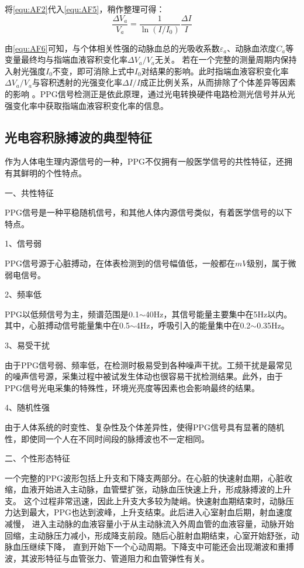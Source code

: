 将\autoref{equ:AF2}代入\autoref{equ:AF5}，稍作整理可得：
\begin{equation}
    \label{equ:AF6}
    \frac{\Delta V_{a}}{V_{a}}=\frac{1}{\ln(I/I_{0})}\frac{\Delta I}{I}
\end{equation}

由\autoref{equ:AF6}可知，与个体相关性强的动脉血总的光吸收系数$\varepsilon _{a}$、动脉血浓度$C_{a}$等变量最终均与指端血液容积变化率$\Delta V_{a}/{V_{a}}$无关。
若在一个完整的测量周期内保持入射光强度$I_{0}$不变，即可消除上式中$I_{0}$对结果的影响。此时指端血液容积变化率$\Delta V_{a}/{V_{a}}$与容积透射的光强变化率$\Delta I/I$成正比例关系，从而排除了个体差异等因素的影响
\cite{1980Spectrophotometric,4122392,PPGYY}。PPG信号检测正是依此原理，通过光电转换硬件电路检测光信号并从光强变化率中获取指端血液容积变化率的信息。

\subsection{光电容积脉搏波的典型特征}
作为人体电生理内源信号的一种，PPG不仅拥有一般医学信号的共性特征，还拥有其鲜明的个性特点。

一、共性特征

PPG信号是一种平稳随机信号，和其他人体内源信号类似，有着医学信号的以下特点\cite{Ma2015,Qiu2012,Naraharisetti2011,Miao2020,LMX2019}。

1、信号弱

PPG信号源于心脏搏动，在体表检测到的信号幅值低，一般都在$mV$级别，属于微弱电信号。

2、频率低

PPG以低频信号为主，频谱范围是0.1$\sim$40Hz，其信号能量主要集中在5Hz以内。其中，心脏搏动信号能量集中在0.5$\sim$4Hz，呼吸引入的能量集中在0.2$\sim$0.35Hz。

3、易受干扰

由于PPG信号弱、频率低，在检测时极易受到各种噪声干扰。工频干扰是最常见的噪声信号源，采集过程中被试发生体动也很容易干扰检测结果。此外，由于PPG信号光电采集的特殊性，环境光亮度等因素也会影响最终的结果。

4、随机性强

由于人体系统的时变性、复杂性及个体差异性，使得PPG信号具有显著的随机性，即使同一个人在不同时间段的脉搏波也不一定相同。

二、个性形态特征

一个完整的PPG波形包括上升支和下降支两部分。在心脏的快速射血期，心脏收缩，血液开始进入主动脉，血管壁扩张，动脉血压快速上升，形成脉搏波的上升支。
这个过程非常迅速，因此上升支大多较为陡峭。快速射血期结束时，动脉压力达到最大，PPG也达到波峰，上升支结束。此后进入心室射血后期，射血速度减慢，
进入主动脉的血液容量小于从主动脉流入外周血管的血液容量，动脉开始回缩，主动脉压力减小，形成降支前段。随后心脏射血期结束，心室开始舒张，动脉血压继续下降，
直到开始下一个心动周期。下降支中可能还会出现潮波和重搏波，其波形特征与血管张力、管道阻力和血管弹性有关\cite{PPGYY,Chen2021}。

